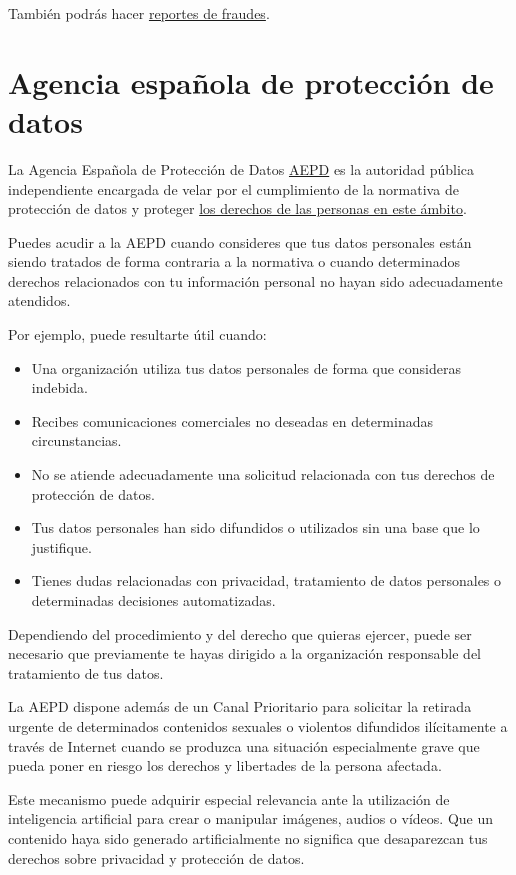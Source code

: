 \documentclass[
  spanish,
  a4paper,
  openany]{book}
\begin{document}
También podrás hacer \href{https://www.incibe.es/ciudadania/ayuda/reporte-de-fraude}{reportes de fraudes}.

\section{Agencia española de protección de datos}\label{agencia-espauxf1ola-de-protecciuxf3n-de-datos}

La Agencia Española de Protección de Datos \href{https://www.aepd.es/es}{AEPD} es la autoridad pública independiente encargada de velar por el cumplimiento de la normativa de protección de datos y proteger \hyperref[derechos-de-protecciuxf3n-de-datos---arsopol]{los derechos de las personas en este ámbito}.

Puedes acudir a la AEPD cuando consideres que tus datos personales están siendo tratados de forma contraria a la normativa o cuando determinados derechos relacionados con tu información personal no hayan sido adecuadamente atendidos.

Por ejemplo, puede resultarte útil cuando:

\begin{itemize}
\item
  Una organización utiliza tus datos personales de forma que consideras indebida.
\item
  Recibes comunicaciones comerciales no deseadas en determinadas circunstancias.
\item
  No se atiende adecuadamente una solicitud relacionada con tus derechos de protección de datos.
\item
  Tus datos personales han sido difundidos o utilizados sin una base que lo justifique.
\item
  Tienes dudas relacionadas con privacidad, tratamiento de datos personales o determinadas decisiones automatizadas.
\end{itemize}

Dependiendo del procedimiento y del derecho que quieras ejercer, puede ser necesario que previamente te hayas dirigido a la organización responsable del tratamiento de tus datos.

La AEPD dispone además de un Canal Prioritario para solicitar la retirada urgente de determinados contenidos sexuales o violentos difundidos ilícitamente a través de Internet cuando se produzca una situación especialmente grave que pueda poner en riesgo los derechos y libertades de la persona afectada.

Este mecanismo puede adquirir especial relevancia ante la utilización de inteligencia artificial para crear o manipular imágenes, audios o vídeos. Que un contenido haya sido generado artificialmente no significa que desaparezcan tus derechos sobre privacidad y protección de datos.
\end{document}
